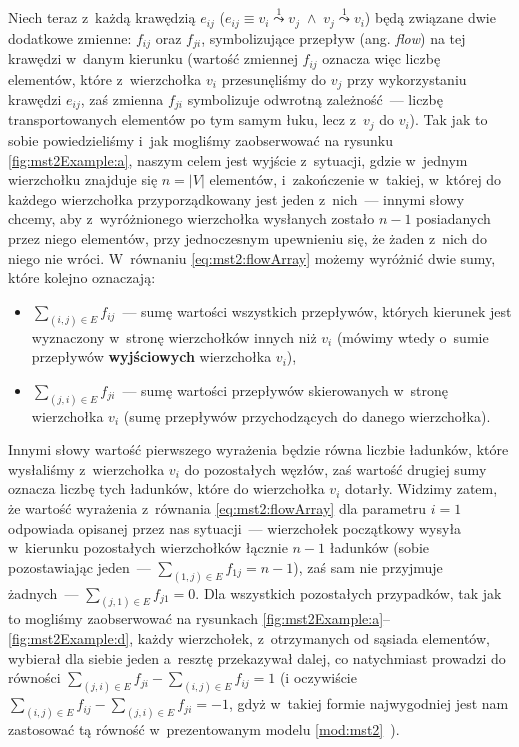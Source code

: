 Niech teraz z~każdą krawędzią $e_{ij}$ ($e_{ij} \equiv v_{i} \overset{1}{\leadsto} v_{j} \; \wedge \; v_{j} \overset{1}{\leadsto} v_{i}$) będą związane dwie dodatkowe zmienne: $f_{ij}$ oraz $f_{ji}$, symbolizujące przepływ (ang. \textit{flow}) na tej krawędzi w~danym kierunku (wartość zmiennej $f_{ij}$ oznacza więc liczbę elementów, które z~wierzchołka $v_{i}$ przesunęliśmy do $v_{j}$ przy wykorzystaniu krawędzi $e_{ij}$, zaś zmienna $f_{ji}$ symbolizuje odwrotną zależność~--- liczbę transportowanych elementów po tym samym łuku, lecz z~$v_{j}$ do $v_{i}$).
Tak jak to sobie powiedzieliśmy i~jak mogliśmy zaobserwować na rysunku \ref{fig:mst2Example:a}, naszym celem jest wyjście z~sytuacji, gdzie w~jednym wierzchołku znajduje się $n = \left| V \right|$ elementów, i~zakończenie w~takiej, w~której do każdego wierzchołka przyporządkowany jest jeden z~nich~--- innymi słowy chcemy, aby z~wyróżnionego wierzchołka wysłanych zostało $n - 1$ posiadanych przez niego elementów, przy jednoczesnym upewnieniu się, że żaden z~nich do niego nie wróci.
W~równaniu \ref{eq:mst2:flowArray} możemy wyróżnić dwie sumy, które kolejno oznaczają:

\begin{itemize}
	\item $\sum_{ \left( i, j \right ) \in E } f_{ij}$~--- sumę wartości wszystkich przepływów, których kierunek jest wyznaczony w~stronę wierzchołków innych niż $v_{i}$ (mówimy wtedy o~sumie przepływów \textbf{wyjściowych} wierzchołka $v_{i}$),
	\item $\sum_{ \left( j, i \right ) \in E } f_{ji}$~--- sumę wartości przepływów skierowanych w~stronę wierzchołka $v_{i}$ (sumę przepływów przychodzących do danego wierzchołka).
\end{itemize}

Innymi słowy wartość pierwszego wyrażenia będzie równa liczbie ładunków, które wysłaliśmy z~wierzchołka $v_{i}$ do pozostałych węzłów, zaś wartość drugiej sumy oznacza liczbę tych ładunków, które do wierzchołka $v_{i}$ dotarły.
Widzimy zatem, że wartość wyrażenia z~równania \ref{eq:mst2:flowArray} dla parametru $i = 1$ odpowiada opisanej przez nas sytuacji~--- wierzchołek początkowy wysyła w~kierunku pozostałych wierzchołków łącznie $n - 1$ ładunków (sobie pozostawiając jeden~--- $\sum_{ \left( 1, j \right ) \in E } f_{1j} = n - 1$), zaś sam nie przyjmuje żadnych~--- $\sum_{ \left( j, 1 \right ) \in E } f_{j1} = 0$.
Dla wszystkich pozostałych przypadków, tak jak to mogliśmy zaobserwować na rysunkach \ref{fig:mst2Example:a}--\ref{fig:mst2Example:d}, każdy wierzchołek, z~otrzymanych od sąsiada elementów, wybierał dla siebie jeden a~resztę przekazywał dalej, co natychmiast prowadzi do równości $\sum_{ \left( j, i \right ) \in E } f_{ji} - \sum_{ \left( i, j \right ) \in E } f_{ij} = 1$ (i oczywiście $\sum_{ \left( i, j \right ) \in E } f_{ij} - \sum_{ \left( j, i \right ) \in E } f_{ji} = -1$, gdyż w~takiej formie najwygodniej jest nam zastosować tą równość w~prezentowanym modelu \ref{mod:mst2}~\cite[$35$]{robustSTP}).

